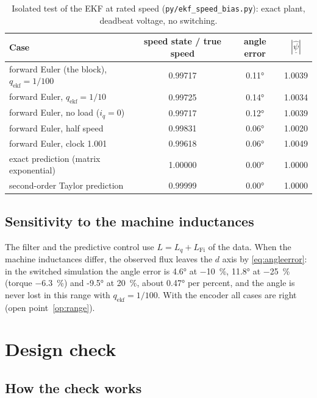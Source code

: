 \documentclass[11pt,a4paper]{scrartcl}
\newcommand{\ped}[1]{_{\mathrm{#1}}}
\newcommand{\code}[1]{\texttt{#1}}
\begin{document}
\begin{onehalfspace}
\begin{table}[H]
	\centering
	\footnotesize
	\caption{Isolated test of the EKF at rated speed (\code{py/ekf\_speed\_bias.py}): exact plant, deadbeat voltage, no switching.}
	\label{tab:bias}
	\begin{tabular}{@{} l c c c @{}}
		\toprule
		\textbf{Case} & \textbf{speed state / true speed} & \textbf{angle error} & $|\hat{\underline{\psi}}|$ \\
		\midrule
		forward Euler (the block), $q\ped{ekf} = 1/100$ & 0.99717 & \ang{+0.11} & 1.0039 \\
		forward Euler, $q\ped{ekf} = 1/10$ & 0.99725 & \ang{+0.14} & 1.0034 \\
		forward Euler, no load ($i_q = 0$) & 0.99717 & \ang{+0.12} & 1.0039 \\
		forward Euler, half speed & 0.99831 & \ang{+0.06} & 1.0020 \\
		forward Euler, clock 1.001 & 0.99618 & \ang{+0.06} & 1.0049 \\
		exact prediction (matrix exponential) & 1.00000 & \ang{0.00} & 1.0000 \\
		second-order Taylor prediction & 0.99999 & \ang{0.00} & 1.0000 \\
		\bottomrule
	\end{tabular}
\end{table}

\subsection{Sensitivity to the machine inductances}

The filter and the predictive control use $L = L_q + L\ped{Fi}$ of the data. When the machine inductances differ, the observed flux leaves the $d$ axis by \eqref{eq:angleerror}: in the switched simulation the angle error is \ang{+4.6} at \SI{-10}{\percent}, \ang{+11.8} at \SI{-25}{\percent} (torque \SI{-6.3}{\percent}) and \ang{-9.5} at \SI{+20}{\percent}, about \ang{0.47} per percent, and the angle is never lost in this range with $q\ped{ekf} = 1/100$. With the encoder all cases are right (open point~\ref{op:range}).

\section{Design check}
\label{sec:check}

\subsection{How the check works}


\end{onehalfspace}
\end{document}
